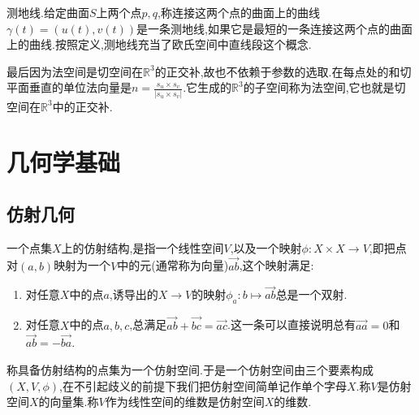 测地线.给定曲面$S$上两个点$p,q$,称连接这两个点的曲面上的曲线$\gamma(t)=(u(t),v(t))$是一条测地线,如果它是最短的一条连接这两个点的曲面上的曲线.按照定义,测地线充当了欧氏空间中直线段这个概念.
























最后因为法空间是切空间在$\mathbb{R}^3$的正交补,故也不依赖于参数的选取.在每点处的和切平面垂直的单位法向量是$n=\frac{s_u\times s_v}{|s_u\times s_v|}$.它生成的$\mathbb{R}^3$的子空间称为法空间,它也就是切空间在$\mathbb{R}^3$中的正交补.


















\chapter{几何学基础}
\section{仿射几何}

一个点集$X$上的仿射结构,是指一个线性空间$V$,以及一个映射$\phi:X\times X\to V$,即把点对$(a,b)$映射为一个$V$中的元(通常称为向量)$\overrightarrow{ab}$,这个映射满足:
\begin{enumerate}
	\item 对任意$X$中的点$a$,诱导出的$X\to V$的映射$\phi_a:b\mapsto\overrightarrow{ab}$总是一个双射.
	\item 对任意$X$中的点$a,b,c$,总满足$\overrightarrow{ab}+\overrightarrow{bc}=\overrightarrow{ac}$.这一条可以直接说明总有$\overrightarrow{aa}=0$和$\overrightarrow{ab}=-\overrightarrow{ba}$.
\end{enumerate}

称具备仿射结构的点集为一个仿射空间.于是一个仿射空间由三个要素构成$(X,V,\phi)$,在不引起歧义的前提下我们把仿射空间简单记作单个字母$X$.称$V$是仿射空间$X$的向量集.称$V$作为线性空间的维数是仿射空间$X$的维数.

